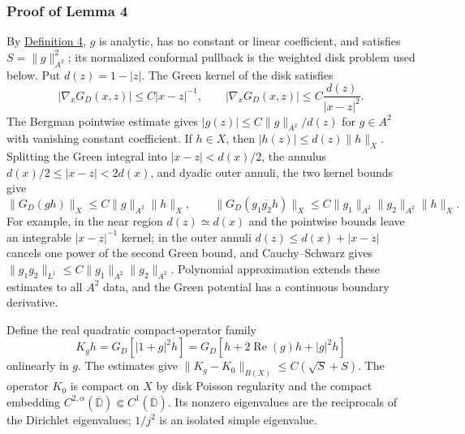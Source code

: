\documentclass[11pt]{article}
\begin{document}
\subsubsection{Proof of Lemma 4}\label{proof-lem-c1-perturbation}

By \hyperref[def-conformal-data]{Definition 4}, \(g\) is analytic, has
no constant or linear coefficient, and satisfies \(S=\|g\|_{A^2}^2\);
its normalized conformal pullback is the weighted disk problem used
below. Put \(d(z)=1-|z|\). The Green kernel of the disk satisfies \[
|\nabla_xG_D(x,z)|\le C|x-z|^{-1},
\qquad
|\nabla_xG_D(x,z)|\le C\frac{d(z)}{|x-z|^2}.
\] The Bergman pointwise estimate gives \(|g(z)|\le C\|g\|_{A^2}/d(z)\)
for \(g\in A^2\) with vanishing constant coefficient. If \(h\in X\),
then \(|h(z)|\le d(z)\|h\|_X\). Splitting the Green integral into
\(|x-z|<d(x)/2\), the annulus \(d(x)/2\le|x-z|<2d(x)\), and dyadic outer
annuli, the two kernel bounds give \[
\|G_D(gh)\|_X\le C\|g\|_{A^2}\|h\|_X,
\qquad
\|G_D(g_1\overline{g_2}h)\|_X\le C\|g_1\|_{A^2}\|g_2\|_{A^2}\|h\|_X.
\] For example, in the near region \(d(z)\simeq d(x)\) and the pointwise
bounds leave an integrable \(|x-z|^{-1}\) kernel; in the outer annuli
\(d(z)\le d(x)+|x-z|\) cancels one power of the second Green bound, and
Cauchy--Schwarz gives
\(\|g_1g_2\|_{L^1}\le C\|g_1\|_{A^2}\|g_2\|_{A^2}\). Polynomial
approximation extends these estimates to all \(A^2\) data, and the Green
potential has a continuous boundary derivative.

Define the real quadratic compact-operator family \[
K_g h=G_D[|1+g|^2h]=G_D[h+2\operatorname{Re}(g)h+|g|^2h]
\] onlinearly in \(g\). The estimates give
\(\|K_g-K_0\|_{B(X)}\le C(\sqrt S+S)\). The operator \(K_0\) is compact
on \(X\) by disk Poisson regularity and the compact embedding
\(C^{2,\alpha}(\overline{\mathbb D})\Subset C^1(\overline{\mathbb D})\).
Its nonzero eigenvalues are the reciprocals of the Dirichlet
eigenvalues; \(1/j^2\) is an isolated simple eigenvalue.
\end{document}

